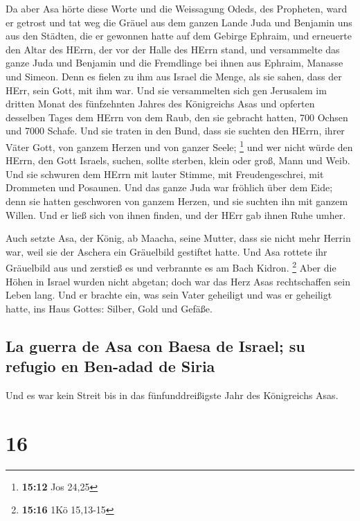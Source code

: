  Da aber Asa hörte diese Worte und die Weissagung Odeds,
des Propheten, ward er getrost und tat weg die Gräuel aus dem ganzen
Lande Juda und Benjamin uns aus den Städten, die er gewonnen hatte auf
dem Gebirge Ephraim, und erneuerte den Altar des HErrn, der vor der
Halle des HErrn stand,  und versammelte das ganze Juda und
Benjamin und die Fremdlinge bei ihnen aus Ephraim, Manasse und Simeon.
Denn es fielen zu ihm aus Israel die Menge, als sie sahen, dass der
HErr, sein Gott, mit ihm war.  Und sie versammelten sich
gen Jerusalem im dritten Monat des fünfzehnten Jahres des Königreichs
Asas  und opferten desselben Tages dem HErrn von dem
Raub, den sie gebracht hatten, 700 Ochsen und 7000 Schafe.
 Und sie traten in den Bund, dass sie suchten den HErrn,
ihrer Väter Gott, von ganzem Herzen und von ganzer Seele; \footnote{\textbf{15:12}
  Jos 24,25}  und wer nicht würde den HErrn, den Gott
Israels, suchen, sollte sterben, klein oder groß, Mann und Weib.
 Und sie schwuren dem HErrn mit lauter Stimme, mit
Freudengeschrei, mit Drommeten und Posaunen.  Und das
ganze Juda war fröhlich über dem Eide; denn sie hatten geschworen von
ganzem Herzen, und sie suchten ihn mit ganzem Willen. Und er ließ sich
von ihnen finden, und der HErr gab ihnen Ruhe umher.

 Auch setzte Asa, der König, ab Maacha, seine Mutter,
dass sie nicht mehr Herrin war, weil sie der Aschera ein Gräuelbild
gestiftet hatte. Und Asa rottete ihr Gräuelbild aus und zerstieß es und
verbrannte es am Bach Kidron. \footnote{\textbf{15:16} 1Kö 15,13-15}
 Aber die Höhen in Israel wurden nicht abgetan; doch war
das Herz Asas rechtschaffen sein Leben lang.  Und er
brachte ein, was sein Vater geheiligt und was er geheiligt hatte, ins
Haus Gottes: Silber, Gold und Gefäße.

\hypertarget{la-guerra-de-asa-con-baesa-de-israel-su-refugio-en-ben-adad-de-siria}{%
\subsection{La guerra de Asa con Baesa de Israel; su refugio en Ben-adad
de
Siria}\label{la-guerra-de-asa-con-baesa-de-israel-su-refugio-en-ben-adad-de-siria}}

 Und es war kein Streit bis in das fünfunddreißigste Jahr
des Königreichs Asas.

\hypertarget{section-15}{%
\section{16}\label{section-15}}

